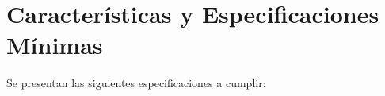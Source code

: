\section{Características y Especificaciones Mínimas}

Se presentan las siguientes especificaciones a cumplir:

